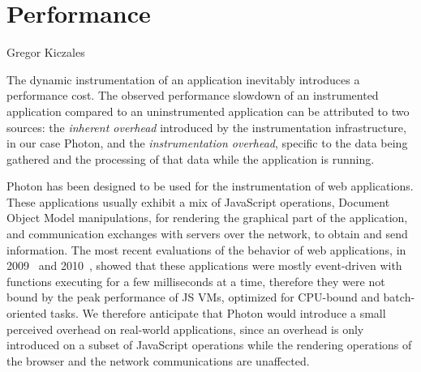 \chapter{Performance}
\label{chap:Performance}



{Gregor Kiczales~\cite{Kiczales92towardsa}}

The dynamic instrumentation of an application inevitably introduces a performance
cost. The observed performance slowdown of an instrumented application
compared to an uninstrumented application can be attributed to two sources: the
\textit{inherent overhead} introduced by the instrumentation infrastructure, in
our case Photon, and the \textit{instrumentation overhead}, specific to the
data being gathered and the processing of that data while the application is
running. 

Photon has been designed to be used for the instrumentation of web
applications. These applications usually exhibit a mix of JavaScript
operations, Document Object Model manipulations, for rendering the
graphical part of the application, and communication exchanges with servers
over the network, to obtain and send information.  The most recent evaluations
of the behavior of web applications, in 2009~\cite{jsmeter} and
2010~\cite{behavior_js}, showed that these applications were mostly
event-driven with functions executing for a few milliseconds at a time,
therefore they were not bound by the peak performance of JS VMs, optimized for
CPU-bound and batch-oriented tasks. We therefore anticipate that Photon would
introduce a small perceived overhead on real-world applications, since an
overhead is only introduced on a subset of JavaScript operations while the
rendering operations of the browser and the network communications are
unaffected.


